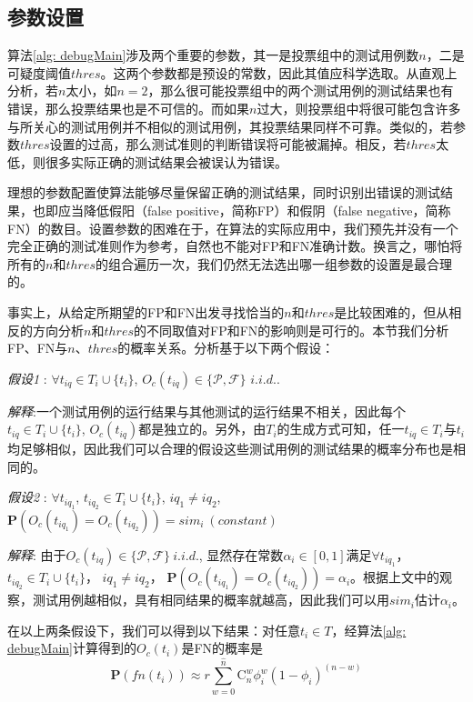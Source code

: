 \subsection{参数设置}
\label{subsection: param}

算法\ref{alg: debugMain}涉及两个重要的参数，其一是投票组中的测试用例数$n$，二是可疑度阈值$thres$。这两个参数都是预设的常数，因此其值应科学选取。从直观上分析，若$n$太小，如$n = 2$，那么很可能投票组中的两个测试用例的测试结果也有错误，那么投票结果也是不可信的。而如果$n$过大，则投票组中将很可能包含许多与所关心的测试用例并不相似的测试用例，其投票结果同样不可靠。类似的，若参数$thres$设置的过高，那么测试准则的判断错误将可能被漏掉。相反，若$thres$太低，则很多实际正确的测试结果会被误认为错误。

理想的参数配置使算法能够尽量保留正确的测试结果，同时识别出错误的测试结果，也即应当降低假阳（false positive，简称FP）和假阴（false negative，简称FN）的数目。设置参数的困难在于，在算法的实际应用中，我们预先并没有一个完全正确的测试准则作为参考，自然也不能对FP和FN准确计数。换言之，哪怕将所有的$n$和$thres$的组合遍历一次，我们仍然无法选出哪一组参数的设置是最合理的。

事实上，从给定所期望的FP和FN出发寻找恰当的$n$和$thres$是比较困难的，但从相反的方向分析$n$和$thres$的不同取值对FP和FN的影响则是可行的。本节我们分析FP、FN与$n$、$thres$的概率关系。分析基于以下两个假设：

\textit{假设1} : $\forall t_{iq}\in T_i \cup \{t_i\}$, $O_c(t_{iq}) \in \{\mathcal{P}, \mathcal{F}\}$  $i.i.d.$.

\textit{解释}:一个测试用例的运行结果与其他测试的运行结果不相关，因此每个$t_{iq}\in T_i \cup \{t_i\}$, $O_c(t_{iq})$都是独立的。另外，由$T_i$的生成方式可知，任一$t_{iq}\in T_i$与$t_i$均足够相似，因此我们可以合理的假设这些测试用例的测试结果的概率分布也是相同的。

\textit{假设2} : $\forall t_{iq_1}$, $t_{iq_2} \in T_i \cup \{t_i\}$, $iq_1 \ne iq_2$,
$\mathbf{P}(O_c(t_{iq_1}) = O_c(t_{iq_2})) = {sim}_i\  (constant)$

\textit{解释}: 由于$O_c(t_{iq}) \in \{\mathcal{P}, \mathcal{F}\}\ i.i.d.$, 显然存在常数$\alpha_i \in [0,1]$满足$\forall t_{iq_1}$， $t_{iq_2} \in T_i \cup \{t_i\}$， $iq_1 \ne iq_2$， $\mathbf{P}(O_c(t_{iq_1}) = O_c(t_{iq_2})) = \alpha_i$。根据上文中的观察，测试用例越相似，具有相同结果的概率就越高，因此我们可以用${sim}_i$估计$\alpha_i$。

在以上两条假设下，我们可以得到以下结果：对任意$t_i \in T$，经算法\ref{alg: debugMain}计算得到的$O_c(t_i)$是FN的概率是	
\begin{equation}
\label{equ: fn single}
\mathbf{P}(fn(t_i))	\approx r \sum_{w = 0}^{\hat{n}}{\mathrm{C}_n^w{\phi_i^w (1-\phi_i)^{(n-w)}}}
\end{equation}

